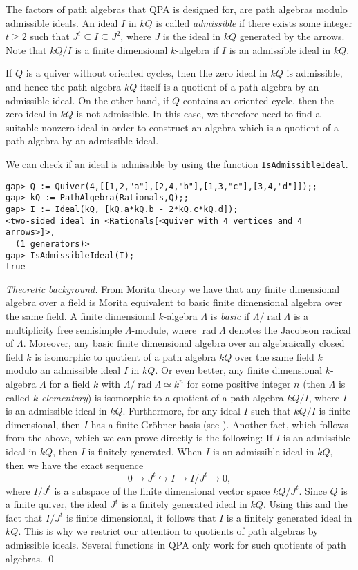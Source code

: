 \documentclass{amsart}
\newcommand{\rad}{\operatorname{rad}\nolimits}
\renewcommand{\L}{\Lambda}
\theoremstyle{definition}
\newcommand{\code}[1]{\texttt{#1}}
\theoremstyle{theoretic}
\newenvironment{theoback}
{\medskip\small\textit{Theoretic background.} }
{\qed\par\medskip}
\begin{document}
The factors of path algebras that QPA is designed for, are path
algebras modulo admissible ideals.  An ideal $I$ in $kQ$ is called
\emph{admissible} if there exists some integer $t\geqslant 2$ such
that $J^t\subseteq I \subseteq J^2$, where $J$ is the ideal in $kQ$
generated by the arrows.  Note that $kQ/I$ is a finite dimensional
$k$-algebra if $I$ is an admissible ideal in $kQ$.

If $Q$ is a quiver without oriented cycles, then the zero ideal in
$kQ$ is admissible, and hence the path algebra $kQ$ itself is a
quotient of a path algebra by an admissible ideal.  On the other hand,
if $Q$ contains an oriented cycle, then the zero ideal in $kQ$ is not
admissible.  In this case, we therefore need to find a suitable
nonzero ideal in order to construct an algebra which is a quotient of
a path algebra by an admissible ideal.

We can check if an ideal is admissible by using the function
\code{IsAdmissibleIdeal}.
\begin{verbatim}
gap> Q := Quiver(4,[[1,2,"a"],[2,4,"b"],[1,3,"c"],[3,4,"d"]]);;
gap> kQ := PathAlgebra(Rationals,Q);;
gap> I := Ideal(kQ, [kQ.a*kQ.b - 2*kQ.c*kQ.d]);
<two-sided ideal in <Rationals[<quiver with 4 vertices and 4 arrows>]>, 
  (1 generators)>
gap> IsAdmissibleIdeal(I);
true
\end{verbatim}

\begin{theoback}
From Morita theory we have that
any finite dimensional algebra over a field is Morita equivalent to
basic finite dimensional algebra over the same field.  A finite
dimensional $k$-algebra $\L$ is \emph{basic} if $\L/\rad \L$ is a
multiplicity free semisimple $\L$-module, where $\rad \L$ denotes the
Jacobson radical of $\L$.  Moreover, any basic finite dimensional
algebra over an algebraically closed field $k$ is isomorphic to
quotient of a path algebra $kQ$ over the same field $k$ modulo an
admissible ideal $I$ in $kQ$.  Or even better, any finite dimensional
$k$-algebra $\L$ for a field $k$ with $\L/\rad\L\simeq k^n$ for some
positive integer $n$ (then $\L$ is called \emph{$k$-elementary}) is
isomorphic to a quotient of a path algebra $kQ/I$, where $I$ is an
admissible ideal in $kQ$.  Furthermore, for any ideal $I$ such that
$kQ/I$ is finite dimensional, then $I$ has a finite Gr\"obner basis
(see \cite{Green}).  Another fact, which follows from the above, which
we can prove directly is the following:  If $I$ is an admissible ideal
in $kQ$, then $I$ is finitely generated.  When $I$ is an admissible
ideal in $kQ$, then we have the exact sequence
\[0\to J^t\hookrightarrow I\to I/J^t\to 0,\] where $I/J^t$ is a
subspace of the finite dimensional vector space $kQ/J^t$.  Since $Q$
is a finite quiver, the ideal $J^t$ is a finitely generated ideal in
$kQ$.  Using this and the fact that $I/J^t$ is finite dimensional, it
follows that $I$ is a finitely generated ideal in $kQ$.  This is why
we restrict our attention to quotients of path algebras by admissible
ideals.  Several functions in QPA only work for such quotients of path
algebras.
\end{theoback}
\end{document}
